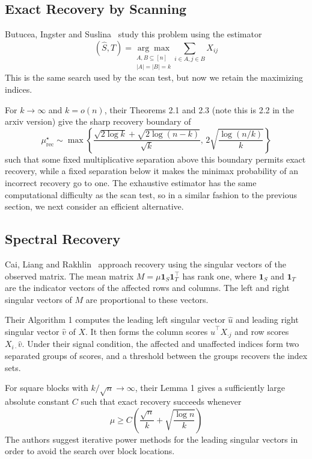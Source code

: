 \documentclass[12pt]{article}
\begin{document}
\subsection{Exact Recovery by Scanning}\label{sec:exact-recovery}

Butucea, Ingster and Suslina~\cite{BIS2015} study this problem using
the estimator
\[
(\widehat S,\widehat T)
=\underset{\substack{A,B\subseteq[n]\\|A|=|B|=k}}{\arg\max}
\sum_{i\in A,j\in B}X_{ij}
\]
This is the same search used by the scan test, but now we retain the
maximizing indices. 

For $k\to\infty$ and $k=o(n)$, their Theorems 2.1 and 2.3 (note this is 2.2 in the arxiv version) give the
sharp recovery boundary of
\[
\mu_{\mathrm{rec}}^\star
\sim\max\left\{
\frac{\sqrt{2\log k}+\sqrt{2\log(n-k)}}{\sqrt k},\,
2\sqrt{\frac{\log(n/k)}{k}}
\right\}
\]
such that some fixed multiplicative separation above this boundary permits exact
recovery, while a fixed separation below it makes the minimax
probability of an incorrect recovery go to one. The exhaustive estimator has the same computational difficulty as
the scan test, so in a similar fashion to the previous section, we next consider an efficient alternative.

\subsection{Spectral Recovery}

Cai, Liang and Rakhlin~\cite{CLR2017} approach recovery using the
singular vectors of the observed matrix. The mean matrix
$M=\mu\mathbf{1}_S\mathbf{1}_T^\top$ has rank one, where $\mathbf{1}_S$ and $\mathbf{1}_T$ are the indicator vectors of
the affected rows and columns. The left and right singular vectors of
$M$ are proportional to these vectors.

Their Algorithm 1 computes the leading left singular vector
$\widehat u$ and leading right singular vector $\widehat v$ of $X$. It then forms the column scores
$\widehat u^\top X_{\cdot j}$ and row scores
$X_{i\cdot}\widehat v$. Under their signal condition,
the affected and unaffected indices form two separated groups of
scores, and a threshold between the groups recovers the index sets.

For square blocks with $k/\sqrt n\to\infty$, their Lemma 1 gives a
sufficiently large absolute constant $C$ such that exact recovery
succeeds whenever
\[
\mu\geq C\left(\frac{\sqrt n}{k}
+\sqrt{\frac{\log n}{k}}\right)
\]
The authors suggest iterative power methods for the leading singular
vectors in order to avoid the search over block locations.
\end{document}
